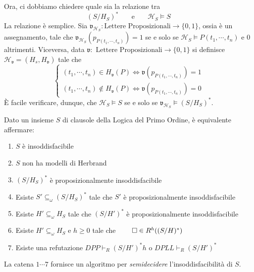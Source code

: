Ora, ci dobbiamo chiedere quale sia la relazione tra 
$$
(S/H_S)^* ~~~~~~~ \text{ e } ~~~~~~~ \mathcal{H}_S \models S
$$
La relazione è semplice. Sia $\mathfrak{v}_{\mathcal{H}_S}: \text{Lettere Proposizionali} \rightarrow \{0,1\}$, 
ossia è un assegnamento, tale che $\mathfrak{v}_{\mathcal{H}_S}(p_{P(t_1, \cdots, t_n)})=1$ se e solo se 
$\mathcal{H}_S\models P(t_1, \cdots, t_n)$ e $0$ altrimenti. Viceversa, 
data $\mathfrak{v}: \text{ Lettere Proposizionali} \rightarrow \{0,1\}$ si definisce 
$\mathcal{H}_{\mathfrak{v}}= (H_s, H_{\mathfrak{v}})$ tale che 
$$
\begin{cases}
(t_1, \cdots, t_n) \in H_{\mathfrak{v}}(P) \iff \mathfrak{v}(p_{P(t_1, \cdots, t_n)}) = 1\\
(t_1, \cdots, t_n) \not\in H_{\mathfrak{v}}(P) \iff \mathfrak{v}(p_{P(t_1, \cdots, t_n)}) = 0
\end{cases}
$$
\`E facile verificare, dunque, che $\mathcal{H}_S \models S$ se e solo se 
$\mathfrak{v}_{\mathcal{H}_S}\models (S/H_S)^*$. 

\begin{defi}
        Dato un insieme $S$ di clausole della Logica del Primo Ordine, 
        è equivalente affermare: 
        \begin{enumerate}
                \item $S$ è insoddisfacibile 
                \item $S$ non ha modelli di Herbrand 
                \item $(S/H_S)^*$ è proposizionalmente insoddisfacibile 
                \item Esiste $S' \subseteq_{\omega} (S/H_S)^*$ tale che $S'$ è 
                        proposizionalmente insoddisfacibile
                \item Esiste $H'\subseteq_{\omega} H_S$ tale che $(S/H')^*$ è 
                        proposizionalmente insoddisfacibile
                \item Esiste $H' \subseteq_{\omega} H_S$ e $h \geq 0$ tale che 
                        $\qed \in R^h((S/H)^*)$
                \item  Esiste una refutazione $DPP \vdash_R (S/H')^*h$ o $DPLL \vdash_R (S/H')^*$
        \end{enumerate}

        La catena $1\cdots7$ fornisce un algoritmo per \textit{semidecidere} 
        l'insoddisfacibilità di $S$.
\end{defi}

